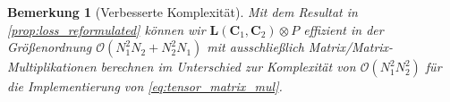 \documentclass[twoside, 12pt,a4paper]{book}
\DeclareMathOperator*{\argmin}{arg\,min}
\newtheorem{proposition}[theorem]{Proposition}
\newtheorem{remark}[theorem]{Bemerkung}
\numberwithin{equation}{section}
\begin{document}
	\begin{remark}[Verbesserte Komplexität]
		Mit dem Resultat in \autoref{prop:loss_reformulated} können wir $\boldsymbol{L} (\boldsymbol{C}_1, \boldsymbol{C}_2) \otimes P$ effizient in der Größenordnung $\mathcal{O}(N_1^2N_2 + N_2^2N_1)$ mit ausschließlich Matrix/Matrix-Multiplikationen berechnen im Unterschied zur Komplexität von $\mathcal{O}(N_1^2N_2^2)$ für die Implementierung von \eqref{eq:tensor_matrix_mul}.
	\end{remark}

\end{document}

